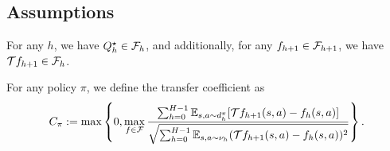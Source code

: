 \subsection{Assumptions}

\label{subsec:HyQ-assumptions}

\begin{assumption}
\label{assump:realizability-completeness}
For any $h$, we have $Q^\star_h\in \mathcal F_h$, and additionally, for any $f_{h+1}\in \mathcal F_{h+1}$, we have $\mathcal T f_{h+1}\in \mathcal F_h$.
\end{assumption}



\begin{definition}
\label{def:bellman-error-coeff-hy-q}
For any policy $\pi$, we define the transfer coefficient as 
\begin{equation}
    C_\pi:=\max\left\{ 0,\max_{f\in \mathcal F}\frac{\sum_{h=0}^{H-1}\mathbb E_{s,a\sim d_h^\pi}[\mathcal T f_{h+1}(s,a)-f_h(s,a)]}{\sqrt{\sum_{h=0}^{H-1}\mathbb E_{s,a\sim \nu_h}(\mathcal T f_{h+1}(s,a)-f_h(s,a))^2}} \right\}.
\end{equation}
\end{definition}

